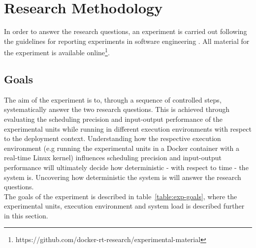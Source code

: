 \iffalse  \fi
\chapter{Research Methodology}\label{section:methodology}

In order to answer the research questions, an experiment is carried out following the guidelines for reporting experiments in software engineering \cite{Andreas}. All material for the experiment is available online\footnote{https://github.com/docker-rt-research/experimental-material}. 


\section{Goals}
The aim of the experiment is to, through a sequence of controlled steps, systematically answer the two research questions. This is achieved through evaluating the scheduling precision and input-output performance of the experimental units while running in different execution environments with respect to the deployment context. Understanding how the respective execution environment (e.g running the experimental units in a Docker container with a real-time Linux kernel) influences scheduling precision and input-output performance will ultimately decide how deterministic - with respect to time - the system is. Uncovering how deterministic the system is will answer the research questions. \\

The goals of the experiment is described in table~\ref{table:exp-goals}, where the experimental units, execution environment and system load is described further in this section. 

